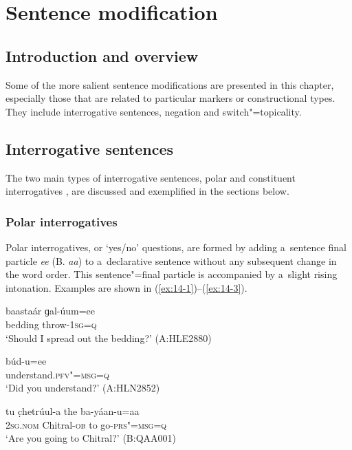 \chapter{Sentence modification}
\label{chap:14}

\section{Introduction and overview}
\label{sec:14-1}


Some of the more salient sentence modifications are presented in this chapter, especially those that are related to particular markers or constructional types. They include interrogative sentences, negation and switch"=topicality.


\section{Interrogative sentences}
\label{sec:14-2}


The two main types of interrogative sentences, polar and constituent interrogatives \citep[290--303]{koenigsiemund2007}, are discussed and exemplified in the sections below. 


\subsection{Polar interrogatives}
\label{subsec:14-2-1}


Polar interrogatives, or `yes/no' questions, are formed by adding a~sentence final particle \textit{ee} (B. \textit{aa}) to a~declarative sentence without any subsequent change in the word order. This sentence"=final particle is accompanied by a~slight rising intonation. Examples are shown in (\ref{ex:14-1})--(\ref{ex:14-3}).

\begin{exe}
\ex
\label{ex:14-1}
\gll baastaár ɡal-úum=ee  \\
bedding throw-\textsc{1sg=q} \\
\glt `Should I spread out the bedding?' (A:HLE2880)

\ex
\label{ex:14-2}
\gll búd-u=ee \\
understand.\textsc{pfv"=msg=q} \\
\glt `Did you understand?' (A:HLN2852)

\ex
\label{ex:14-3}
\gll tu c̣hetrúul-a the ba-yáan-u=aa \\
\textsc{2sg.nom} Chitral-\textsc{ob} to go-\textsc{prs"=msg=q} \\
\glt `Are you going to Chitral?' (B:QAA001)
\end{exe}

